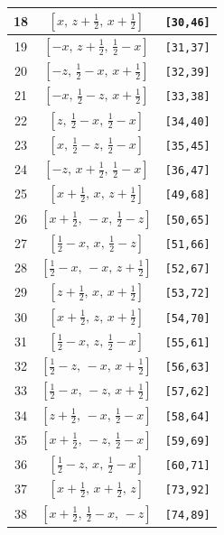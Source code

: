 \documentclass[fleqn,8pt]{jsarticle}
\begin{document}
\begin{longtable}{ccc}
18 & $\left[ x,\, z + \frac{1}{2},\, x + \frac{1}{2} \right]$ & {\tt [30,46]} \\ \hline
19 & $\left[ - x,\, z + \frac{1}{2},\, \frac{1}{2} - x \right]$ & {\tt [31,37]} \\ \hline
20 & $\left[ - z,\, \frac{1}{2} - x,\, x + \frac{1}{2} \right]$ & {\tt [32,39]} \\ \hline
21 & $\left[ - x,\, \frac{1}{2} - z,\, x + \frac{1}{2} \right]$ & {\tt [33,38]} \\ \hline
22 & $\left[ z,\, \frac{1}{2} - x,\, \frac{1}{2} - x \right]$ & {\tt [34,40]} \\ \hline
23 & $\left[ x,\, \frac{1}{2} - z,\, \frac{1}{2} - x \right]$ & {\tt [35,45]} \\ \hline
24 & $\left[ - z,\, x + \frac{1}{2},\, \frac{1}{2} - x \right]$ & {\tt [36,47]} \\ \hline
25 & $\left[ x + \frac{1}{2},\, x,\, z + \frac{1}{2} \right]$ & {\tt [49,68]} \\ \hline
26 & $\left[ x + \frac{1}{2},\, - x,\, \frac{1}{2} - z \right]$ & {\tt [50,65]} \\ \hline
27 & $\left[ \frac{1}{2} - x,\, x,\, \frac{1}{2} - z \right]$ & {\tt [51,66]} \\ \hline
28 & $\left[ \frac{1}{2} - x,\, - x,\, z + \frac{1}{2} \right]$ & {\tt [52,67]} \\ \hline
29 & $\left[ z + \frac{1}{2},\, x,\, x + \frac{1}{2} \right]$ & {\tt [53,72]} \\ \hline
30 & $\left[ x + \frac{1}{2},\, z,\, x + \frac{1}{2} \right]$ & {\tt [54,70]} \\ \hline
31 & $\left[ \frac{1}{2} - x,\, z,\, \frac{1}{2} - x \right]$ & {\tt [55,61]} \\ \hline
32 & $\left[ \frac{1}{2} - z,\, - x,\, x + \frac{1}{2} \right]$ & {\tt [56,63]} \\ \hline
33 & $\left[ \frac{1}{2} - x,\, - z,\, x + \frac{1}{2} \right]$ & {\tt [57,62]} \\ \hline
34 & $\left[ z + \frac{1}{2},\, - x,\, \frac{1}{2} - x \right]$ & {\tt [58,64]} \\ \hline
35 & $\left[ x + \frac{1}{2},\, - z,\, \frac{1}{2} - x \right]$ & {\tt [59,69]} \\ \hline
36 & $\left[ \frac{1}{2} - z,\, x,\, \frac{1}{2} - x \right]$ & {\tt [60,71]} \\ \hline
37 & $\left[ x + \frac{1}{2},\, x + \frac{1}{2},\, z \right]$ & {\tt [73,92]} \\ \hline
38 & $\left[ x + \frac{1}{2},\, \frac{1}{2} - x,\, - z \right]$ & {\tt [74,89]} \\ \hline

\end{longtable}
\end{document}
